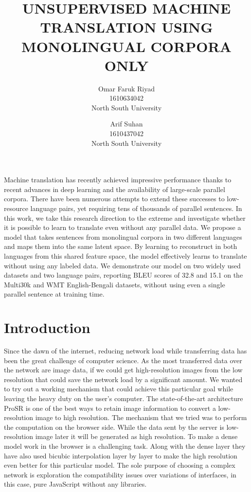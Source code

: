 \documentclass[a4paper,12pt]{article}
\title
{
	UNSUPERVISED MACHINE TRANSLATION USING MONOLINGUAL CORPORA ONLY
}
\author
{
	Omar Faruk Riyad  \\
	1610634042 \\ 
	North South University  \\
	\and 
	Arif Suhan \\
	1610437042 \\
	North South University  \\
}
\providecommand{\keywords}[1]{\textbf{\textit{Keywords:}} #1}
\begin{document}
\maketitle

\abstract
{
	Machine translation has recently achieved impressive performance thanks to recent advances in deep learning and the availability of large-scale parallel corpora. There have been numerous attempts to extend these successes to low-resource language pairs, yet requiring tens of thousands of parallel sentences. In this work, we take this research direction to the extreme and investigate whether it is possible to learn to translate even without any parallel data. We propose a model that takes sentences from monolingual corpora in two different languages and maps them into the same latent space. By learning to reconstruct in both languages from this shared feature space, the model effectively learns to translate without using any labeled data. We demonstrate our model on two widely used datasets and two language pairs, reporting BLEU scores of 32.8 and 15.1 on the Multi30k and WMT English-Bengali datasets, without using even a single parallel sentence at training time.\cite{ref1}
} 


\section{Introduction}

Since the dawn of the internet, reducing network load while transferring data has been the great challenge of computer science. As the most transferred data over the network are image data, if we could get high-resolution images from the low resolution that could save the network load by a significant amount. We wanted to try out a working mechanism that could achieve this particular goal while leaving the heavy duty on the user's computer. The state-of-the-art architecture ProSR is one of the best ways to retain image information to convert a low-resolution image to high resolution. The mechanism that we tried was to perform the computation on the browser side. While the data sent by the server is low-resolution image later it will be generated as high resolution. To make a dense model work in the browser is a challenging task. Along with the dense layer they have also used bicubic interpolation layer by layer to make the high resolution even better for this particular model. The sole purpose of choosing a complex network is exploration the compatibility issues over variations of interfaces, in this case, pure JavaScript without any libraries.
\end{document}
